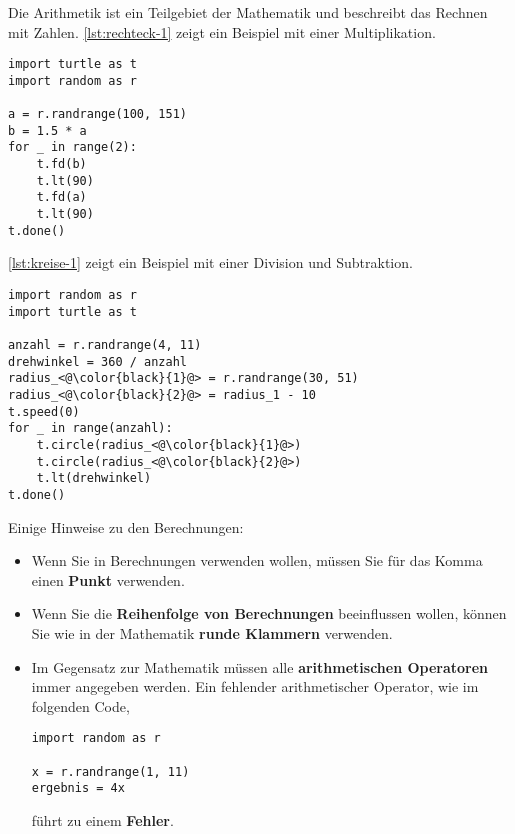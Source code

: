 \vspace{-0.2cm}

Die Arithmetik ist ein Teilgebiet der Mathematik und beschreibt das Rechnen mit Zahlen. \autoref{lst:rechteck-1} zeigt ein Beispiel mit einer Multiplikation.

\begin{lstlisting}[language={python3}, label={lst:rechteck-1}, caption={Das Rechteck ist eineinhalbmal so lang wie breit.}]
import turtle as t
import random as r

a = r.randrange(100, 151)
b = 1.5 * a
for _ in range(2):
	t.fd(b)
	t.lt(90)
	t.fd(a)
	t.lt(90)
t.done()

\end{lstlisting}

\vspace{-0.6cm}


\autoref{lst:kreise-1} zeigt ein Beispiel mit einer Division und Subtraktion.

\begin{lstlisting}[language={python3}, label={lst:kreise-1}, caption={Die Anzahl der Kreise und der Radius des grösseren Kreises werden zufällig gewählt.}]
import random as r
import turtle as t

anzahl = r.randrange(4, 11)
drehwinkel = 360 / anzahl
radius_<@\color{black}{1}@> = r.randrange(30, 51)
radius_<@\color{black}{2}@> = radius_1 - 10
t.speed(0)
for _ in range(anzahl):
	t.circle(radius_<@\color{black}{1}@>)
	t.circle(radius_<@\color{black}{2}@>)
	t.lt(drehwinkel)
t.done()

\end{lstlisting}

\begin{important}
Einige Hinweise zu den Berechnungen:
\begin{itemize}
\item Wenn Sie  in Berechnungen verwenden wollen, müssen Sie für das Komma einen \textbf{Punkt} verwenden. 
\item Wenn Sie die \textbf{Reihenfolge von Berechnungen} beeinflussen wollen, können Sie wie in der Mathematik \textbf{runde Klammern} verwenden.
\item Im Gegensatz zur Mathematik müssen alle \textbf{arithmetischen Operatoren} immer angegeben werden. Ein fehlender arithmetischer Operator, wie im folgenden Code,
	
\begin{lstlisting}[language={python3}]
import random as r

x = r.randrange(1, 11)
ergebnis = 4x
\end{lstlisting}

führt zu einem \textbf{Fehler}.

\end{itemize}

\end{important}

